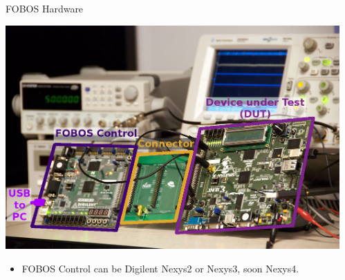 \documentclass[xcolor=pdftex,dvipsnames,table,final]{beamer}
\begin{document}
\begin{frame}[fragile]{}
\begin{columns}[t]
\begin{column}{.31\linewidth}
      \begin{block}{FOBOS Hardware}
        \vspace{-1ex}
        \begin{center}
          \includegraphics[width=0.9\linewidth]{../figures/FOBOS-label}
        \end{center} 
        \begin{itemize}
          \item FOBOS Control can be Digilent Nexys2 or Nexys3, soon Nexys4.
        \end{itemize}
        \vspace{-0.2ex}
       \end{block}
     
    \end{column}
    \begin{column}{.31\linewidth}
   
      



\end{column}
\end{columns}
\end{frame}
\end{document}
